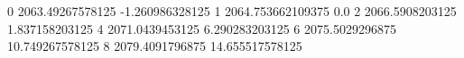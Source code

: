 0 2063.49267578125 -1.260986328125
1 2064.753662109375 0.0
2 2066.5908203125 1.837158203125
4 2071.0439453125 6.290283203125
6 2075.5029296875 10.749267578125
8 2079.4091796875 14.655517578125
